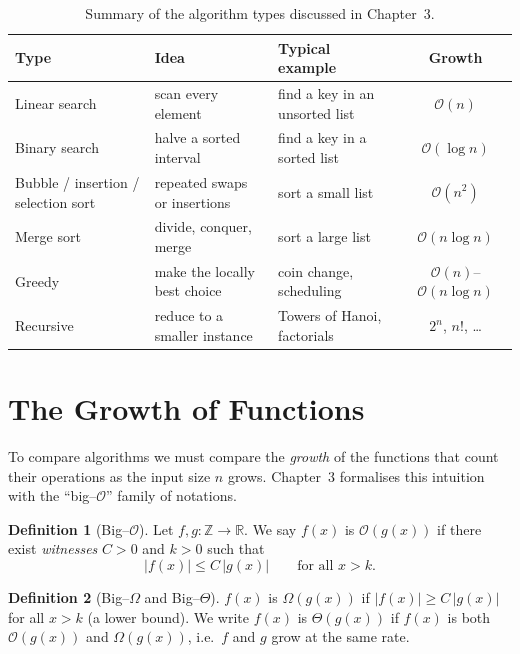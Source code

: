 \documentclass[11pt,a4paper]{article}
\theoremstyle{definition}
\newtheorem{definition}{Definition}[section]
\theoremstyle{plain}
\newcommand{\bigO}{\mathcal{O}}
\newcommand{\bigOmega}{\Omega}
\newcommand{\bigTheta}{\Theta}
\begin{document}
\begin{table}[htbp]
\centering
\small
\caption{Summary of the algorithm types discussed in Chapter~3.}
\label{tab:types}
\begin{tabular}{@{}p{3.4cm}p{4.4cm}p{4.2cm}c@{}}
\toprule
\textbf{Type} & \textbf{Idea} & \textbf{Typical example} & \textbf{Growth}\\
\midrule
Linear search & scan every element & find a key in an unsorted list & $\bigO(n)$\\
Binary search & halve a sorted interval & find a key in a sorted list & $\bigO(\log n)$\\
Bubble / insertion / selection sort & repeated swaps or insertions & sort a small list & $\bigO(n^2)$\\
Merge sort & divide, conquer, merge & sort a large list & $\bigO(n\log n)$\\
Greedy & make the locally best choice & coin change, scheduling & $\bigO(n)$--$\bigO(n\log n)$\\
Recursive & reduce to a smaller instance & Towers of Hanoi, factorials & $2^n$, $n!$, \dots\\
\bottomrule
\end{tabular}
\end{table}

\section{The Growth of Functions}

To compare algorithms we must compare the \emph{growth} of the functions that
count their operations as the input size $n$ grows. Chapter~3 formalises this
intuition with the ``big--$\bigO$'' family of notations.

\begin{definition}[Big--$\bigO$]
Let $f,g:\mathbb{Z}\to\mathbb{R}$. We say $f(x)$ is $\bigO(g(x))$ if there exist
\emph{witnesses} $C>0$ and $k>0$ such that
\[
|f(x)|\le C\,|g(x)| \qquad \text{for all } x>k .
\]
\end{definition}

\begin{definition}[Big--$\bigOmega$ and Big--$\bigTheta$]
$f(x)$ is $\bigOmega(g(x))$ if $|f(x)|\ge C\,|g(x)|$ for all $x>k$ (a lower
bound). We write $f(x)$ is $\bigTheta(g(x))$ if $f(x)$ is both
$\bigO(g(x))$ and $\bigOmega(g(x))$, i.e.\ $f$ and $g$ grow at the same rate.
\end{definition}
\end{document}
